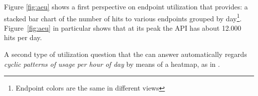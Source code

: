 Figure \ref{fig:aeu} shows a first perspective on endpoint utilization that \tool provides: a stacked bar chart of the number of hits to various endpoints grouped by day\footnote{Endpoint colors are the same in different views}. Figure~\ref{fig:aeu} in particular shows that at its peak the API has about 12.000 hits per day. 


  
  
  




A second type of utilization question that the \tool can answer automatically regards {\em cyclic patterns of usage per hour of day} by means of a heatmap, as in . 


